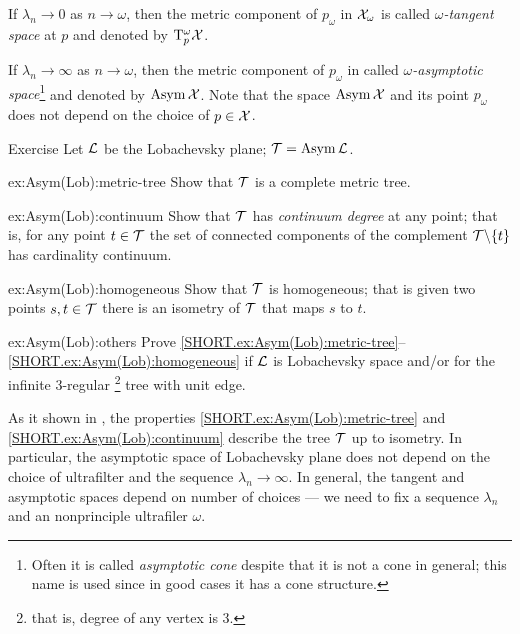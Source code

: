 If $\lambda_n\to 0$ as $n\to\omega$, then the metric component of $p_\omega$ in $\mathcal{X}_\omega$ is called \emph{$\omega$-tangent space} at $p$ and denoted by $\mathrm{T}_p^\omega\mathcal{X}$.\label{page:ultratangent space}

If $\lambda_n\to \infty$ as $n\to\omega$, then the metric component of $p_\omega$ in called \emph{$\omega$-asymptotic space}\footnote{Often it is called \emph{asymptotic cone} despite that it is not a cone in general; this name is used since in good cases it has a cone structure.}  and denoted by $\mathop{\rm Asym}\nolimits\mathcal{X}$.
Note that the space $\mathop{\rm Asym}\nolimits\mathcal{X}$ and its point $p_\omega$ does not depend on the choice of $p\in \mathcal{X}$.

\begin{thm}{Exercise}\label{ex:Asym(Lob)}
Let $\mathcal{L}$ be the Lobachevsky plane; $\mathcal{T}=\mathop{\rm Asym}\nolimits\mathcal{L}$.

\begin{subthm}{ex:Asym(Lob):metric-tree}
Show that $\mathcal{T}$ is a complete metric tree.
\end{subthm}

\begin{subthm}{ex:Asym(Lob):continuum}
Show that $\mathcal{T}$ has \emph{continuum degree} at any point;
that is, for any point $t\in \mathcal{T}$ the set of connected components of the complement $\mathcal{T}\backslash\{t\}$ has cardinality continuum.
\end{subthm}

\begin{subthm}{ex:Asym(Lob):homogeneous}
Show that $\mathcal{T}$ is homogeneous; that is given two points $s,t\in \mathcal{T}$ there is an isometry of $\mathcal{T}$ that maps $s$ to $t$.
\end{subthm}

\begin{subthm}{ex:Asym(Lob):others}
Prove \ref{SHORT.ex:Asym(Lob):metric-tree}--\ref{SHORT.ex:Asym(Lob):homogeneous} if $\mathcal{L}$ is Lobachevsky space and/or for the infinite 3-regular%
\footnote{that is, degree of any vertex is 3.}
tree with unit edge. 
\end{subthm}


\end{thm}

As it shown in \cite{dyubina-polterovich}, the properties \ref{SHORT.ex:Asym(Lob):metric-tree} and \ref{SHORT.ex:Asym(Lob):continuum} describe the tree $\mathcal{T}$ up to isometry.
In particular, the asymptotic space of Lobachevsky plane does not depend on the choice of ultrafilter and the sequence $\lambda_n\to \infty$.
In general, the tangent and asymptotic spaces depend on number of choices --- we need to fix a sequence $\lambda_n$ and an nonprinciple ultrafiler $\omega$.
